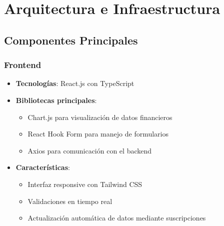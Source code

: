\section{Arquitectura e Infraestructura}

\subsection*{Componentes Principales}
\subsubsection*{Frontend}
\begin{itemize}
    \item \textbf{Tecnologías}: React.js con TypeScript
    \item \textbf{Bibliotecas principales}:
    \begin{itemize}
        \item Chart.js para visualización de datos financieros
        \item React Hook Form para manejo de formularios
        \item Axios para comunicación con el backend
    \end{itemize}
    \item \textbf{Características}:
    \begin{itemize}
        \item Interfaz responsive con Tailwind CSS
        \item Validaciones en tiempo real
        \item Actualización automática de datos mediante suscripciones
    \end{itemize}
\end{itemize}

